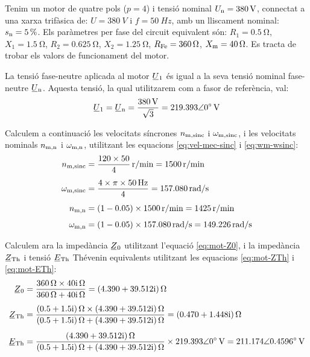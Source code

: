 \begin{exemple}\label{ex:CaractMotor}
	\addcontentsxms{\CaractMotor}	
    Tenim un motor de quatre pols ($p=4$) i tensió nominal $U_\mathrm{n}=\qty{380}{V}$, connectat a una xarxa trifàsica de: $U=\qty{380}{V}$ i $f=\qty{50}{Hz}$, amb un lliscament nominal: $s_\mathrm{n}=\qty{5}{\percent}$. Els paràmetres per fase del circuit equivalent són: $R_1=\qty{0,5}{\ohm}$, $X_1=\qty{1,5}{\ohm}$, $R_2=\qty{0,625}{\ohm}$, $X_2=\qty{1,25}{\ohm}$, $R_\mathrm{Fe}=\qty{360}{\ohm}$, $X_\mathrm{m}=\qty{40}{\ohm}$. Es tracta de trobar els valors de funcionament del motor.

    La tensió fase-neutre aplicada al motor $\cmplx{U}_1$ és igual a la seva tensió nominal  fase-neutre  $\cmplx{U}\ped{n}$. Aquesta tensió, la qual utilitzarem com a fasor de referència, val:
    \[
        \cmplx{U}_1 = \cmplx{U}\ped{n} = \frac{\qty{380}{V}}{\sqrt{3}} = \complexqty{219,393:0}{V}
    \]

    Calculem a continuació les velocitats síncrones $n_\mathrm{m,sinc}$ i $\omega_\mathrm{m,sinc}$, i les velocitats nominals $n_\mathrm{m,n}$ i $\omega_\mathrm{m,n}$, utilitzant les equacions \eqref{eq:vel-mec-sinc} i \eqref{eq:wm-wsinc}:
    \begin{align*}
        n\ped{m,sinc} &= \frac{120\times 50}{4} \, \unit{r/min} = \qty{1500}{r/min} \\[1ex]
        \omega\ped{m,sinc} &= \frac{4 \times\pi \times\qty{50}{Hz}}{4} =  \qty{157,080}{rad/s} \\[1ex]
        n\ped{m,n} &= (1-\num{0,05})\times \qty{1500}{r/min} = \qty{1425}{r/min} \\[1ex]
        \omega\ped{m,n} &= (1-\num{0,05}) \times\qty{157,080}{rad/s} = \qty{149,226}{rad/s}
    \end{align*}

    Calculem ara la impedància $\cmplx{Z}_0$ utilitzant l'equació \eqref{eq:mot-Z0}, i la impedància $\cmplx{Z}\ped{Th}$ i tensió $\cmplx{E}\ped{Th}$ Thévenin equivalents utilitzant les equacions \eqref{eq:mot-ZTh} i \eqref{eq:mot-ETh}:
     \begin{align*}
        \cmplx{Z}_0 &= \frac{\qty{360}{\ohm}\times\complexqty{j40}{\ohm}}{\qty{360}{\ohm}+\complexqty{j40}{\ohm}} = \complexqty{4,390+j39,512}{\ohm} \\[1ex]
        \cmplx{Z}\ped{Th} &= \frac{\complexqty{0,5+j1,5}{\ohm}\times\complexqty{4,390+j39,512}{\ohm}}
        {\complexqty{0,5+j1,5}{\ohm}+\complexqty{4,390+j39,512}{\ohm}} =  \complexqty{0,470+j1,448}{\ohm} \\[1ex]
        \cmplx{E}\ped{Th}  &= \frac{\complexqty{4,390+j39,512}{\ohm}}
        {\complexqty{0,5+j1,5}{\ohm}+\complexqty{4,390+j39,512}{\ohm}}\times\complexqty{219,393:0}{V} =  \complexqty{211,174:0,4596}{V}
    \end{align*}


\end{exemple}
